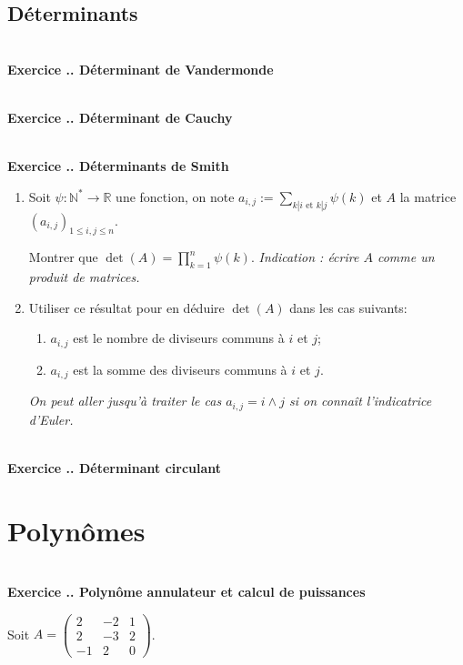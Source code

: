 \documentclass{article}
\newcommand{\mb}[1]{\mathbb{#1}}
\newcounter{exo}
\newcommand{\exercice}[1][\null]{\textbf{\\ Exercice \thesection.\theexo. #1} \addtocounter{exo}{1}}
\begin{document}
\subsection{Déterminants}

\exercice[Déterminant de Vandermonde]

\exercice[Déterminant de Cauchy]

\exercice[Déterminants de Smith]

\begin{enumerate}

\item Soit $\psi : \mb{N}^* \rightarrow \mb{R}$ une fonction, on note $\displaystyle a_{i,j} := \sum_{k|i \text{ et } k |j} \psi(k)$ et $A$ la matrice $(a_{i,j})_{1 \le i, j \le n}$.

Montrer que $ \det(A) = \prod_{k=1}^n \psi(k)$. \emph{Indication : écrire $A$ comme un produit de matrices.}

\item Utiliser ce résultat pour en déduire $\det(A)$ dans les cas suivants:

\begin{enumerate}

\item $a_{i,j}$ est le nombre de diviseurs communs à $i$ et $j$;

\item  $a_{i,j}$ est la somme des diviseurs communs à $i$ et $j$.

\end{enumerate}

\emph{On peut aller jusqu'à traiter le cas $a_{i,j} = i \wedge j$ si on connaît l'indicatrice d'Euler.}

\end{enumerate}



\exercice[Déterminant circulant]













\section{Polynômes}


\exercice[Polynôme annulateur et calcul de puissances]

Soit $A = \begin{pmatrix} 2 & -2 & 1 \\ 2& -3& 2 \\ -1 & 2 & 0 \end{pmatrix}$.
\end{document}
